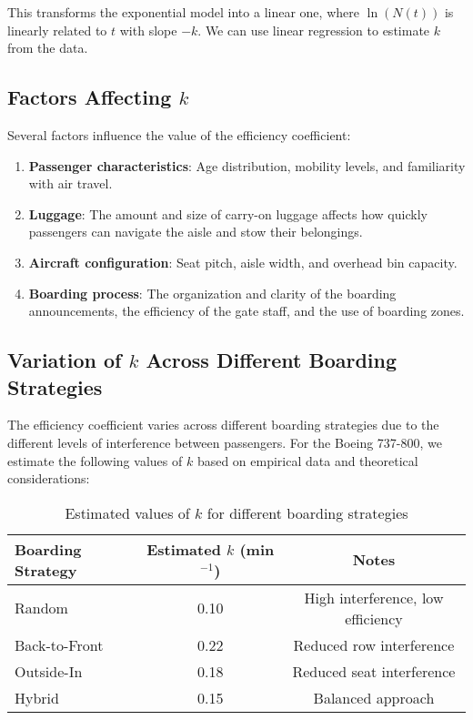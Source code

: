 \documentclass[12pt,a4paper]{article}
\begin{document}
This transforms the exponential model into a linear one, where $\ln(N(t))$ is linearly related to $t$ with slope $-k$. We can use linear regression to estimate $k$ from the data.

\subsection{Factors Affecting $k$}

Several factors influence the value of the efficiency coefficient:

\begin{enumerate}
    \item \textbf{Passenger characteristics}: Age distribution, mobility levels, and familiarity with air travel.
    \item \textbf{Luggage}: The amount and size of carry-on luggage affects how quickly passengers can navigate the aisle and stow their belongings.
    \item \textbf{Aircraft configuration}: Seat pitch, aisle width, and overhead bin capacity.
    \item \textbf{Boarding process}: The organization and clarity of the boarding announcements, the efficiency of the gate staff, and the use of boarding zones.
\end{enumerate}

\subsection{Variation of $k$ Across Different Boarding Strategies}

The efficiency coefficient varies across different boarding strategies due to the different levels of interference between passengers. For the Boeing 737-800, we estimate the following values of $k$ based on empirical data and theoretical considerations:

\begin{table}[H]
\centering
\begin{tabular}{|l|c|c|}
\hline
\textbf{Boarding Strategy} & \textbf{Estimated $k$ (min$^{-1}$)} & \textbf{Notes} \\ \hline
Random & 0.10 & High interference, low efficiency \\ \hline
Back-to-Front & 0.22 & Reduced row interference \\ \hline
Outside-In & 0.18 & Reduced seat interference \\ \hline
Hybrid & 0.15 & Balanced approach \\ \hline
\end{tabular}
\caption{Estimated values of $k$ for different boarding strategies}
\label{tab:k_values}
\end{table}
\end{document}
